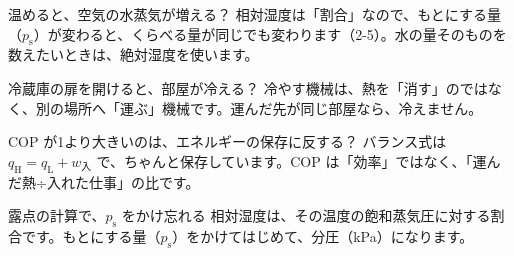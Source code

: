 \begin{tsumazuki}{温めると、空気の水蒸気が増える？}
相対湿度は「割合」なので、もとにする量（$p_{\mathrm s}$）が変わると、くらべる量が同じでも変わります（2-5）。水の量そのものを数えたいときは、絶対湿度を使います。
\end{tsumazuki}
\begin{tsumazuki}{冷蔵庫の扉を開けると、部屋が冷える？}
冷やす機械は、熱を「消す」のではなく、別の場所へ「運ぶ」機械です。運んだ先が同じ部屋なら、冷えません。
\end{tsumazuki}
\begin{tsumazuki}{COP が1より大きいのは、エネルギーの保存に反する？}
バランス式は $q_{\mathrm H}=q_{\mathrm L}+w_{\text{入}}$ で、ちゃんと保存しています。COP は「効率」ではなく、「運んだ熱÷入れた仕事」の比です。
\end{tsumazuki}
\begin{tsumazuki}{露点の計算で、$p_{\mathrm s}$ をかけ忘れる}
相対湿度は、その温度の飽和蒸気圧に対する割合です。もとにする量（$p_{\mathrm s}$）をかけてはじめて、分圧（kPa）になります。
\end{tsumazuki}

